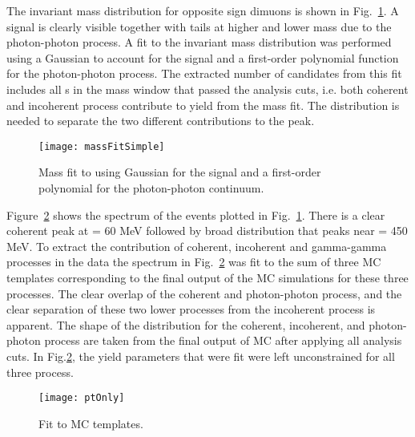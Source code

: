     The invariant mass distribution for opposite sign dimuons is shown in 
      Fig.~\ref{fig:massFit}. 
    A \JPsi{} signal is clearly visible together with tails at higher and
      lower mass due to the photon-photon process.
    A fit to the invariant mass distribution was performed using a Gaussian
      to account for the \JPsi{} signal and a first-order polynomial function 
      for the photon-photon process.
    The extracted number of \JPsi{} candidates from this fit includes all 
      \JPsi{}s in the mass window that passed the analysis cuts, i.e. both
      coherent and incoherent process contribute to yield from the mass
      fit.
    The \pt{} distribution is needed to separate the two different 
      contributions to the \JPsi{} peak. 

    \begin{figure}[!Hhtb]
      \centering
      \texttt{[image: massFitSimple]}
      \caption{Mass fit to \JPsi{} using Gaussian for the 
        signal and a first-order polynomial for the photon-photon continuum.}
      \label{fig:massFit}
    \end{figure}

    Figure~\ref{fig:ptTemps} shows the \pt{} spectrum of the events plotted 
      in Fig.~\ref{fig:massFit}.  
    There is a clear coherent peak at \pt{} = 60 MeV followed by broad 
      distribution that peaks near \pt{} = 450 MeV. 
    To extract the contribution of coherent, incoherent and gamma-gamma 
      processes in the data the spectrum in  Fig.~\ref{fig:ptTemps} was fit to 
      the sum of three MC templates corresponding to the final output of the MC
      simulations for these three processes.       
    The clear overlap of the coherent and photon-photon process, and the 
      clear separation of these two lower \pt{} processes from the incoherent
      process is apparent.
    The shape of the \pt{} distribution for the coherent, incoherent, and 
      photon-photon process are taken from the final output of MC after
      applying all analysis cuts. 
    In Fig.\ref{fig:ptTemps}, the yield parameters that were fit were left
      unconstrained for all three process.

    \begin{figure}[!Hhbt]
      \centering
      \texttt{[image: ptOnly]}
      \caption{ Fit to MC \pt{} templates. }
      \label{fig:ptTemps}
    \end{figure}

